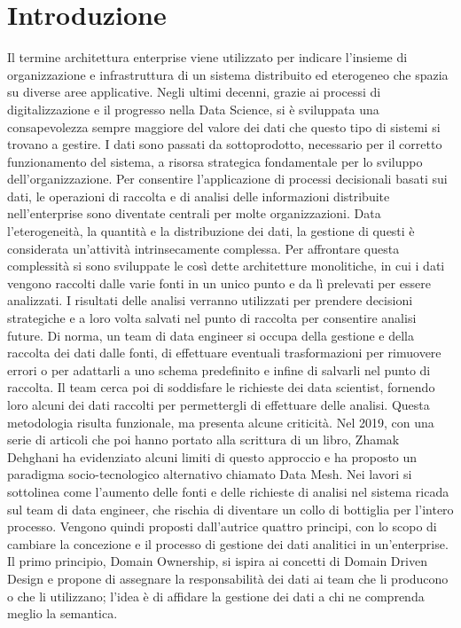 \documentclass[a4paper,12pt]{report}
\begin{document}
\chapter*{Introduzione}
Il termine architettura enterprise viene utilizzato per indicare l'insieme di organizzazione e infrastruttura di un sistema distribuito ed eterogeneo che spazia su diverse aree applicative.
Negli ultimi decenni, grazie ai processi di digitalizzazione e il progresso nella Data Science, si è sviluppata una consapevolezza sempre maggiore del valore dei dati che questo tipo di sistemi si trovano a gestire.
I dati sono passati da sottoprodotto, necessario per il corretto funzionamento del sistema, a risorsa strategica fondamentale per lo sviluppo dell'organizzazione.
Per consentire l'applicazione di processi decisionali basati sui dati, le operazioni di raccolta e di analisi delle informazioni distribuite nell'enterprise sono diventate centrali per molte organizzazioni.
Data l'eterogeneità, la quantità e la distribuzione dei dati, la gestione di questi è considerata un'attività intrinsecamente complessa.
Per affrontare questa complessità si sono sviluppate le così dette architetture monolitiche, in cui i dati vengono raccolti dalle varie fonti in un unico punto e da lì prelevati per essere analizzati.
I risultati delle analisi verranno utilizzati per prendere decisioni strategiche e a loro volta salvati nel punto di raccolta per consentire analisi future.
Di norma, un team di data engineer si occupa della gestione e della raccolta dei dati dalle fonti, di effettuare eventuali trasformazioni per rimuovere errori o per adattarli a uno schema predefinito e infine di salvarli nel punto di raccolta.
Il team cerca poi di soddisfare le richieste dei data scientist, fornendo loro alcuni dei dati raccolti per permettergli di effettuare delle analisi.
Questa metodologia risulta funzionale, ma presenta alcune criticità.
Nel 2019, con una serie di articoli che poi hanno portato alla scrittura di un libro, Zhamak Dehghani ha evidenziato alcuni limiti di questo approccio e ha proposto un paradigma socio-tecnologico alternativo chiamato Data Mesh.
Nei lavori si sottolinea come l'aumento delle fonti e delle richieste di analisi nel sistema ricada sul team di data engineer, che rischia di diventare un collo di bottiglia per l'intero processo.
Vengono quindi proposti dall'autrice quattro principi, con lo scopo di cambiare la concezione e il processo di gestione dei dati analitici in un'enterprise. 
Il primo principio, Domain Ownership, si ispira ai concetti di Domain Driven Design e propone di assegnare la responsabilità dei dati ai team che li producono o che li utilizzano; l'idea è di affidare la gestione dei dati a chi ne comprenda meglio la semantica.
\end{document}
